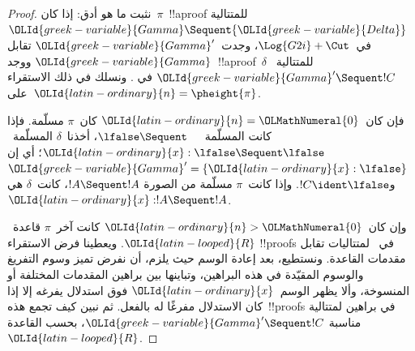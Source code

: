 \documentclass[../../../include/open-logic-section]{subfiles}
\begin{document}
\begin{proof}
  نثبت ما هو أدق: إذا كان~$\pi$~!!a{proof} للمتتالية
  ${\OLId{greek-variable}{Gamma}} \Sequent {\OLId{greek-variable}{Delta}}$ في~$\Log{G2i}+\Cut$، وجدت~${\OLId{greek-variable}{Gamma}}'$ تقابل
  ${\OLId{greek-variable}{Gamma}}$ ووجد~!!a{proof}~$\delta$ للمتتالية~${\OLId{greek-variable}{Gamma}}' \Sequent !C$ في
  . ونسلك في ذلك الاستقراء على~${\OLId{latin-ordinary}{n}} = \pheight{\pi}$.

  فإن كان~${\OLId{latin-ordinary}{n}} = {\OLMathNumeral{0}}$ كان~$\pi$ مسلّمة. فإذا كانت المسلّمة~$\lfalse \Sequent
  \quad$، أخذنا~$\delta$ المسلّمة~${\OLId{latin-ordinary}{x}}:\lfalse \Sequent \lfalse$؛ أي إن
  ${\OLId{greek-variable}{Gamma}}' = \{{\OLId{latin-ordinary}{x}}:\lfalse\}$ و$!C \ident \lfalse$. وإذا كانت~$\pi$ مسلّمة
  من الصورة $!A \Sequent !A$، كانت~$\delta$ هي ${\OLId{latin-ordinary}{x}}: !A \Sequent !A$.
  
  وإن كان~${\OLId{latin-ordinary}{n}}>{\OLMathNumeral{0}}$ كانت آخر~$\pi$ قاعدة~${\OLId{latin-looped}{R}}$. ويعطينا فرض الاستقراء
  !!{proof}s في~ لمتتاليات تقابل مقدمات القاعدة. ونستطيع، بعد
  إعادة الوسم حيث يلزم، أن نفرض تميز وسوم التفريغ والوسوم المقيّدة في هذه
  البراهين، وتباينها بين براهين المقدمات المختلفة أو المنسوخة، وألا يظهر
  الوسم~${\OLId{latin-ordinary}{x}}$ فوق استدلال يفرغه إلا إذا كان الاستدلال مفرغًا له بالفعل.
  ثم نبين كيف تجمع هذه~!!{proof}s في براهين لمتتالية مناسبة
  ${\OLId{greek-variable}{Gamma}}' \Sequent !C$، بحسب القاعدة~${\OLId{latin-looped}{R}}$.


\end{proof}
\end{document}
